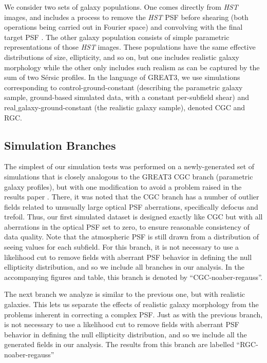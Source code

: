 \documentclass[iop]{emulateapj}
\begin{document}
We consider two sets of galaxy populations.  One comes directly from
{\it HST} images, and includes a process to remove the {\it HST} PSF before
shearing (both operations being carried out in Fourier space) and
convolving with the final target PSF \citep{2012MNRAS.420.1518M}.  The
other galaxy population consists of simple parametric representations
of those {\it HST} images.  These populations have the same effective
distributions of size, ellipticity, and so on, but one includes
realistic galaxy morphology while the other only includes such realism
as can be captured by the sum of two S\'{e}rsic profiles.  In the
language of GREAT3, we use simulations corresponding to
control-ground-constant (describing the parametric galaxy sample,
ground-based simulated data, with a constant per-subfield shear) and
real$\_$galaxy-ground-constant (the realistic galaxy sample), denoted
CGC and RGC.

\subsection{Simulation Branches}


The simplest of our simulation tests was performed on a
newly-generated set of simulations that is closely analogous to the
GREAT3 CGC branch (parametric galaxy profiles), but with one
modification to avoid a problem raised in the results paper
\citep{2015MNRAS.450.2963M}.  There, it was noted that the CGC branch
has a number of outlier fields related to unusually large optical PSF
aberrations, specifically defocus and trefoil.  Thus, our first
simulated dataset is designed exactly like CGC but with all
aberrations in the optical PSF set to zero, to ensure reasonable
consistency of data quality.  Note that the atmospheric PSF is still
drawn from a distribution of seeing values for each subfield. For this
branch, it is not necessary to use a likelihood cut to remove fields
with aberrant PSF behavior in defining the null ellipticity
distribution, and so we include all branches in our analysis. In the
accompanying figures and table, this branch is denoted by
``CGC-noaber-regauss''.

The next branch we analyze is similar to the previous one, but with
realistic galaxies. This lets us separate the effects of realistic
galaxy morphology from the problems inherent in correcting a complex
PSF. Just as with the previous branch, is not necessary to use a
likelihood cut to remove fields with aberrant PSF behavior in defining
the null ellipticity distribution, and so we include all the generated
fields in our analysis. The results from this branch are labelled
``RGC-noaber-regauss''
\end{document}
